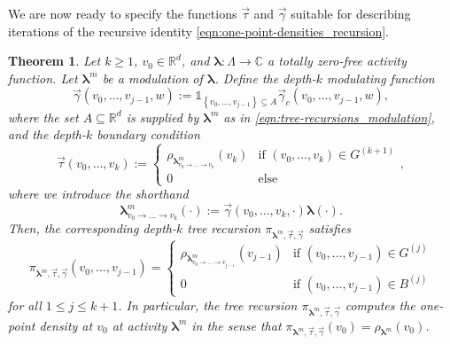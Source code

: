 \documentclass[11pt]{article}
\newcommand{\R}{\mathbb R}
\newcommand{\C}{\mathbb C}
\newcommand{\bl}{\bm{\lambda}}
\newcommand{\set}[1]{\left\{#1\right\}}
\newcommand{\indicator}[1]{\mathds{1}_{#1}}
\numberwithin{equation}{section}
\theoremstyle{plain}
\newtheorem{theorem}{Theorem}[section]
\theoremstyle{definition}
\theoremstyle{remark}
\begin{document}
We are now ready to specify the functions $\vec{\tau}$ and $\vec{\gamma}$ suitable for describing iterations of the recursive identity \eqref{eqn:one-point-densities_recursion}.

\begin{theorem}
\label{thm:tree-recursions_density-correspondence}
Let $k\ge 1$, $v_{0}\in\R^{d}$, and $\bl:\Lambda\rightarrow\C$ a totally zero-free activity function.
Let $\bl^{m}$ be a modulation of $\bl$.
Define the depth-$k$ modulating function 
\begin{equation}
\label{eqn:tree-recursions_modulating-function-choice}
\vec{\gamma}(v_{0},\dots,v_{j-1},w):=\indicator{\set{v_{0},\dots,v_{j-1}}\subseteq A}\vec{\gamma}_{c}(v_{0},\dots,v_{j-1},w),
\end{equation}
where the set $A\subseteq\R^{d}$ is supplied by $\bl^{m}$ as in \eqref{eqn:tree-recursions_modulation}, and the depth-$k$ boundary condition 
\begin{equation}
\label{eqn:tree-recursions_boundary-condition-choice}
\vec{\tau}(v_{0},\dots,v_{k}):=
\begin{cases}
\rho_{\bl^{m}_{v_{0}\rightarrow\dots\rightarrow v_{k}}}(v_{k}) & \text{if } (v_{0},\dots,v_{k})\in G^{(k+1)} \\
0 & \text{else}
\end{cases},
\end{equation}
where we introduce the shorthand
\begin{equation}
\label{eqn:tree-recursions_shorthand}
\bl^{m}_{v_{0}\rightarrow\dots\rightarrow v_{k}}(\cdot)
:=\vec{\gamma}(v_{0},\dots,v_{k},\cdot)\bl(\cdot).
\end{equation}
Then, the corresponding depth-$k$ tree recursion $\pi_{\bl^{m},\vec{\tau},\vec{\gamma}}$ satisfies
\begin{equation}
\label{eqn:tree-recursions_stronger-recursion-density-relation}
\pi_{\bl^{m},\vec{\tau},\vec{\gamma}}(v_{0},\dots,v_{j-1})=
\begin{cases}
\rho_{\bl^{m}_{v_{0}\rightarrow\dots\rightarrow v_{j-1}}}(v_{j-1}) & \text{if }(v_{0},\dots,v_{j-1})\in G^{(j)} \\
0 & \text{if }(v_{0},\dots,v_{j-1})\in B^{(j)}
\end{cases}
\end{equation}
for all $1\le j\le k+1$.
In particular, the tree recursion $\pi_{\bl^{m},\vec{\tau},\vec{\gamma}}$ computes the one-point density at $v_{0}$ at activity $\bl^{m}$ in the sense that $\pi_{\bl^{m},\vec{\tau},\vec{\gamma}}(v_{0})=\rho_{\bl^{m}}(v_{0})$.
\end{theorem}
\end{document}
